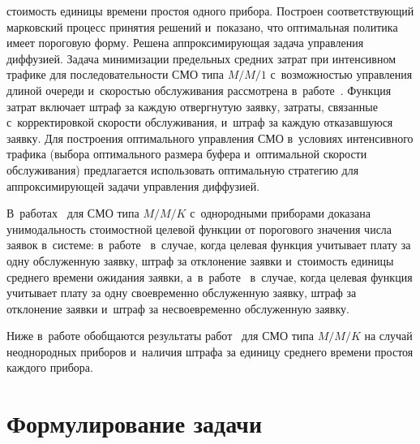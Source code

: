 \begin{multicols}{2}
стоимость единицы времени простоя одного прибора. Построен
соответствующий марковский процесс принятия решений и~показано, что
оптимальная политика имеет пороговую форму. Решена аппроксимирующая
задача управ\-ле\-ния диффузией. Задача минимизации предельных средних затрат
при интенсивном трафике для по\-сле\-до\-ва\-тель\-ности СМО типа $M/M/1$
с~возможностью управ\-ле\-ния длиной очереди и~ско\-ростью об\-слу\-жи\-ва\-ния
рассмотрена в~работе~\cite{10-ag}. Функция затрат включает штраф за каж\-дую
отвергнутую заявку, затраты, связанные с~корректировкой ско\-рости
обслуживания, и~штраф за каж\-дую отказавшуюся заявку. Для построения
оптимального управления СМО в~условиях интенсивного трафика (выбора
оптимального размера буфера и~оптимальной скорости обслуживания)
предлагается использовать оптимальную стратегию для аппроксимирующей
задачи управления диффузией. 

В~работах~\cite{11-ag, 12-ag} для СМО типа
$M/M/K$ с~однородными приборами доказана унимодальность стоимостной
целевой функции от порогового значения числа заявок в~системе:
в~работе~\cite{11-ag} в~случае, когда целевая функция учитывает плату за
одну обслуженную заявку, штраф за отклонение заявки и~стоимость единицы
среднего времени ожидания заявки, а~в~работе~\cite{12-ag} в~случае, когда
целевая функция учитывает плату за одну своевременно обслуженную заявку,
штраф за отклонение заявки и~штраф за несвоевременно обслуженную заявку.

Ниже в~работе обобщаются результаты работ~\cite{11-ag, 12-ag} для СМО
типа $M/M/K$ на случай неоднородных приборов и~наличия штрафа за
единицу среднего времени простоя каждого прибора.

\section{Формулирование задачи}


\end{multicols}
